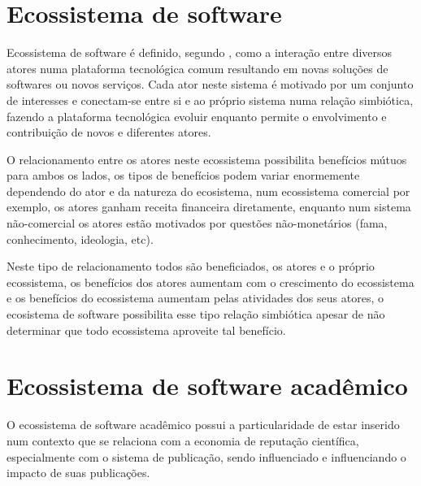 \section{Ecossistema de software}


Ecossistema de software é definido, segundo ,
como a interação entre diversos atores numa plataforma tecnológica comum
resultando em novas soluções de softwares ou novos serviços. Cada ator neste
sistema é motivado por um conjunto de interesses e conectam-se entre si e ao
próprio sistema numa relação simbiótica, fazendo a plataforma tecnológica
evoluir enquanto permite o envolvimento e contribuição de novos e diferentes
atores.

O relacionamento entre os atores neste ecossistema possibilita benefícios
mútuos para ambos os lados, os tipos de benefícios podem variar enormemente
dependendo do ator e da natureza do ecosistema, num ecossistema comercial por
exemplo, os atores ganham receita financeira diretamente, enquanto num sistema
não-comercial os atores estão motivados por questões não-monetários (fama,
conhecimento, ideologia, etc).

Neste tipo de relacionamento todos são beneficiados, os atores e o próprio
ecossistema, os benefícios dos atores aumentam com o crescimento do ecossistema
e os benefícios do ecossistema aumentam pelas atividades dos seus atores,
o ecosistema de software possibilita esse tipo relação simbiótica apesar de
não determinar que todo ecossistema aproveite tal benefício.

%
%

\section{Ecossistema de software acadêmico}

O ecossistema de software acadêmico possui a particularidade de estar inserido
num contexto que se relaciona com a economia de reputação científica,
especialmente com o sistema de publicação, sendo influenciado e influenciando
o impacto de suas publicações.

